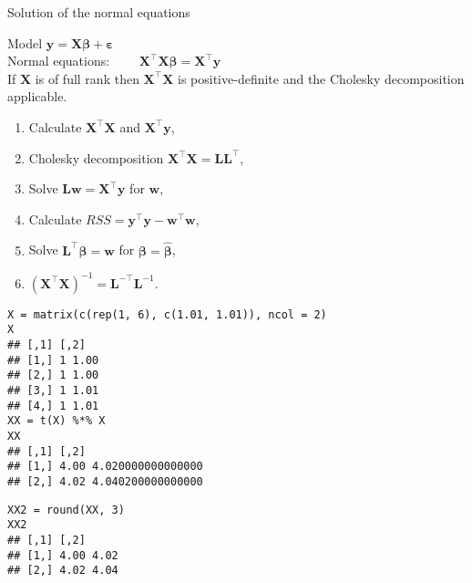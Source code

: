 \documentclass[11pt,compress,t,notes=noshow, xcolor=table]{beamer}
\begin{document}
\begin{vbframe}{Solution of the normal equations}

Model $\mathbf{y} = \mathbf{X}\boldsymbol{\beta} + \boldsymbol{\varepsilon}$\\
\medskip
Normal equations: $ \qquad \mathbf{X}^\top\mathbf{X}\boldsymbol{\beta} = \mathbf{X}^\top\mathbf{y}$\\
\medskip
If $\mathbf{X}$ is of full rank then $\mathbf{X}^\top\mathbf{X}$ is positive-definite and the Cholesky decomposition applicable.

\begin{enumerate}
\item Calculate $\mathbf{X}^\top\mathbf{X}$ and $\mathbf{X}^\top\mathbf{y}$,
\item Cholesky decomposition $\mathbf{X}^\top\mathbf{X} = \mathbf{LL}^\top$,
\item Solve $\mathbf{Lw} = \mathbf{X}^\top\mathbf{y}$ for $\mathbf{w}$,
\item Calculate $RSS = \mathbf{y}^\top\mathbf{y} - \mathbf{w}^\top\mathbf{w}$,
\item Solve $\mathbf{L}^\top\boldsymbol{\beta} = \mathbf{w}$ for $\boldsymbol{\beta} = \hat{\boldsymbol{\beta}}$,
\item $(\mathbf{X}^\top\mathbf{X})^{-1} = \mathbf{L}^{-\top}\mathbf{L}^{-1}$.
\end{enumerate}

\framebreak
\footnotesize
\begin{verbatim}
X = matrix(c(rep(1, 6), c(1.01, 1.01)), ncol = 2)
X
## [,1] [,2]
## [1,] 1 1.00
## [2,] 1 1.00
## [3,] 1 1.01
## [4,] 1 1.01
XX = t(X) %*% X
XX
## [,1] [,2]
## [1,] 4.00 4.020000000000000
## [2,] 4.02 4.040200000000000
\end{verbatim}


\framebreak
\begin{verbatim}
XX2 = round(XX, 3)
XX2
## [,1] [,2]
## [1,] 4.00 4.02
## [2,] 4.02 4.04
\end{verbatim}


\end{vbframe}
\end{document}
